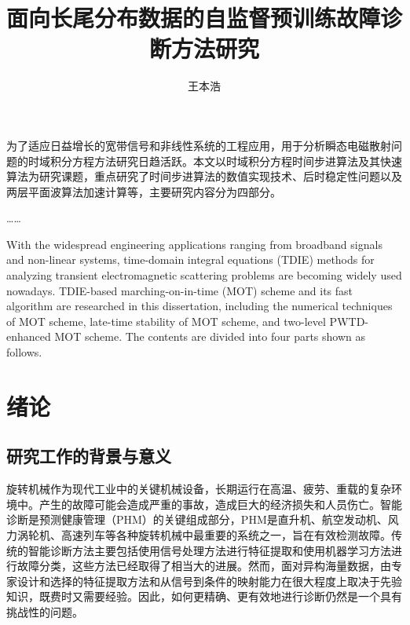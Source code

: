 \documentclass[master]{thesis-uestc}
\title{面向长尾分布数据的自监督预训练故障诊断方法研究}{}
\author{王本浩}{Wang Benhao}
\begin{document}
\makecover

\begin{chineseabstract}
为了适应日益增长的宽带信号和非线性系统的工程应用，用于分析瞬态电磁散射问题的时域积分方程方法研究日趋活跃。本文以时域积分方程时间步进算法及其快速算法为研究课题，重点研究了时间步进算法的数值实现技术、后时稳定性问题以及两层平面波算法加速计算等，主要研究内容分为四部分。

……

\end{chineseabstract}

\begin{englishabstract}
With the widespread engineering applications ranging from broadband signals and non-linear systems, time-domain integral equations (TDIE) methods for analyzing transient electromagnetic scattering problems are becoming widely used nowadays. TDIE-based marching-on-in-time (MOT) scheme and its fast algorithm are researched in this dissertation, including the numerical techniques of MOT scheme, late-time stability of MOT scheme, and two-level PWTD-enhanced MOT scheme. The contents are divided into four parts shown as follows.

\end{englishabstract}

\thesistableofcontents

\chapter{绪\hspace{6pt}论}

\section{研究工作的背景与意义}
旋转机械作为现代工业中的关键机械设备，长期运行在高温、疲劳、重载的复杂环境中。产生的故障可能会造成严重的事故，造成巨大的经济损失和人员伤亡。智能诊断是预测健康管理（PHM）的关键组成部分，PHM是直升机、航空发动机、风力涡轮机、高速列车等各种旋转机械中最重要的系统之一，旨在有效检测故障。传统的智能诊断方法主要包括使用信号处理方法进行特征提取和使用机器学习方法进行故障分类，这些方法已经取得了相当大的进展。然而，面对异构海量数据，由专家设计和选择的特征提取方法和从信号到条件的映射能力在很大程度上取决于先验知识，既费时又需要经验。因此，如何更精确、更有效地进行诊断仍然是一个具有挑战性的问题。
\end{document}
